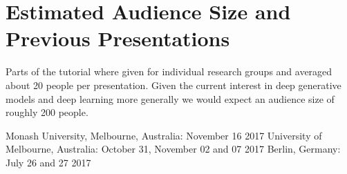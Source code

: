 \section{Estimated Audience Size and Previous Presentations}

Parts of the tutorial where given for individual research groups and averaged about 20 people per presentation. Given the current interest in deep generative models and deep learning more generally we 
would expect an audience size of roughly 200 people.

Monash University, Melbourne, Australia: November 16 2017
University of Melbourne, Australia: October 31, November 02 and 07 2017
Berlin, Germany: July 26 and 27 2017
